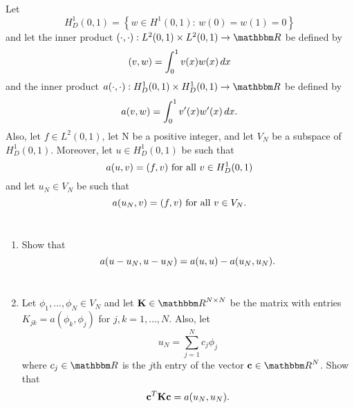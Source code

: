
Let
\[
H^1_D(0,1)=\left\{w\in H^1(0,1):\,w(0)=w(1)=0\right\}
\]
and let the inner product $\ip{\cdot,\cdot}:L^2(0,1)\times L^2(0,1)\to\R$ be defined by
\[
(v,w)=\int_0^1v(x)w(x)\,dx
\]
and the inner product $a\ip{\cdot,\cdot}:H^1_D(0,1)\times H^1_D(0,1)\to\R$ be defined by
\[
a(v,w)=\int_0^1v'(x)w'(x)\,dx.
\]
Also, let $f\in L^2(0,1)$, let N be a positive integer, and let $V_N$ be a subspace of $H^1_D(0,1)$. Moreover, let $u\in H^1_D(0,1)$ be such that
\[
a(u,v)=(f,v)\mbox{ for all }v\in H^1_D(0,1)
\]
and let $u_N\in V_N$ be such that
\[
a(u_N,v)=(f,v)\mbox{ for all }v\in V_N.
\]
\\
\begin{enumerate}
\item Show that
\[
a(u-u_N,u-u_N)=a(u,u)-a(u_N,u_N).
\]
\\
\item Let $\phi_1,\ldots,\phi_N\in V_N$ and let $\BK\in\R^{N\times N}$ be the matrix with entries $K_{jk}=a(\phi_k,\phi_j)$ for $j,k=1,\ldots,N$. Also, let
\[
u_N=\sum_{j=1}^Nc_j\phi_j
\]
where $c_j\in\R$ is the $j$th entry of the vector $\Bc\in\R^N$. Show that
\[
{\bf c}^T{\bf K}{\bf c}=a(u_N,u_N).
\]
\end{enumerate}

           

